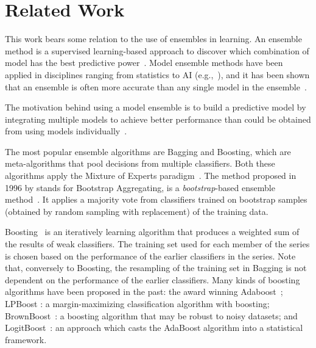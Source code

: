 \section{Related Work}
\label{sec-RelWork}

This work bears some relation to the use of ensembles in learning.
An ensemble
method is a supervised learning-based approach to discover which
combination of model has the best predictive
power~\citep{kuncheva2003measures}.
Model ensemble methods have been applied in disciplines ranging from statistics
to AI (e.g.,~\citep{breiman1996stacked,wolpert1992stacked}),
and it has been shown that an ensemble is often more accurate than any single
model in the ensemble~\citep{maclin2011popular}.

The motivation behind using a model ensemble is to build a predictive
model by integrating multiple models to achieve better performance
than could be obtained from using models
individually~\citep{maclin2011popular,rokach2010ensemble}. 

The most popular ensemble algorithms are Bagging and Boosting, which are meta-algorithms
that pool decisions from multiple classifiers. Both these algorithms apply the Mixture
of Experts paradigm~\citep{brown2010ensemble}.
%
The method proposed in 1996 by \cite{breiman1996stacked} stands for
Bootstrap Aggregating, is a \textit{bootstrap}-based ensemble
method~\citep{efron1994introduction}.  It applies a majority vote from
classifiers trained on bootstrap samples (obtained by random sampling
with replacement) of the training data.

Boosting~\citep{freund1996experiments,schapire1990strength} is an
iteratively learning algorithm that produces a weighted sum of the
results of weak classifiers. The training set used for each member of
the series is chosen based on the performance of the earlier
classifiers in the series. Note that, conversely to Boosting, the
resampling of the training set in Bagging is not dependent on the
performance of the earlier classifiers.  Many kinds of boosting
algorithms have been proposed in the past: the award winning
Adaboost~\citep{freund1996experiments}; LPBoost
\citep{demiriz2002linear}: a margin-maximizing classification
algorithm with boosting; BrownBoost~\cite{freund2001adaptive}: a
boosting algorithm that may be robust to noisy datasets; and
LogitBoost~\citep{friedman2000additive}: an approach which casts the
AdaBoost algorithm into a statistical framework.

